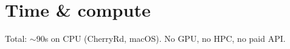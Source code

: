 \documentclass[11pt]{article}
\begin{document}
\section{Time \& compute}

Total: $\sim$90s on CPU (CherryRd, macOS). No GPU, no HPC, no paid API.


\end{document}

